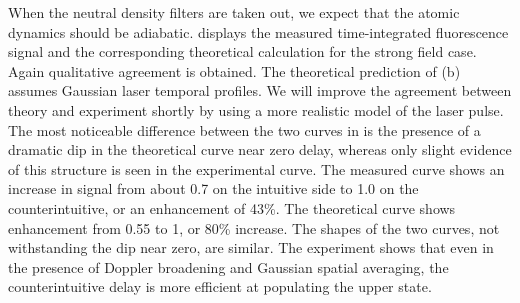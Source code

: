 \begin{figure}[tbp]
\bigskip
{}
\end{figure}

When the neutral density filters are taken out, we expect that the
atomic dynamics should be adiabatic.   displays
the measured time-integrated fluorescence signal and the corresponding
theoretical calculation for the strong field case.  Again qualitative agreement
is obtained.  The theoretical prediction of (b) assumes
Gaussian laser temporal profiles.  We will improve the agreement between theory
and experiment shortly by using a more realistic model of the laser pulse.  The
most noticeable difference between the two curves in  is the
presence of a dramatic dip in the theoretical curve near zero delay, whereas
only slight evidence of this structure is seen in the experimental curve.  The
measured curve shows an increase in signal from about 0.7 on the intuitive side
to 1.0 on the counterintuitive, or an enhancement of 43\%.  The theoretical
curve shows enhancement from 0.55 to 1, or 80\% increase.  The shapes of the
two curves, not withstanding the dip near zero, are similar.  The experiment
shows that even in the presence of Doppler broadening and Gaussian spatial
averaging, the counterintuitive delay is more efficient at populating the upper
state.

\begin{figure}[tbp]
\bigskip
{}
\end{figure}

